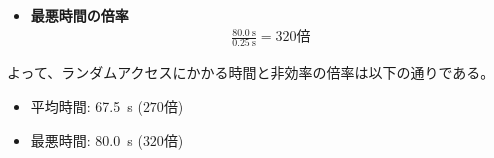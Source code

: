 \documentclass[a4paper,11pt,openany]{ltjsreport}
\begin{document}
\begin{enumerate}[label=(\arabic*)]
\begin{itemize}
		      \item \textbf{最悪時間の倍率}
		            \begin{align*}
			            \frac{\SI{80.0}{\s}}{\SI{0.25}{\s}} = 320\mathrm{倍}
		            \end{align*}
	      \end{itemize}

	      よって、ランダムアクセスにかかる時間と非効率の倍率は以下の通りである。
	      \begin{itemize}
		      \item 平均時間: \SI{67.5}{\s} ($270$倍)
		      \item 最悪時間: \SI{80.0}{\s} ($320$倍)
	      \end{itemize}
\end{enumerate}

\end{document}
